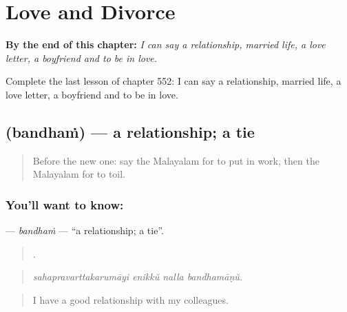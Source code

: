 
\chapter{Love and Divorce}
\label{ch:ml-love-and-divorce}

\begin{chapteropening}
\textbf{By the end of this chapter:} \emph{I can say a relationship, married life, a love letter, a boyfriend and to be in love.}

Complete the last lesson of chapter 552: I can say a relationship, married life, a love letter, a boyfriend and to be in love.
\end{chapteropening}

\section[\texorpdfstring{\ml{ബന്ധം} (bandhaṁ)}{ബന്ധം (bandhaṁ)}]{ (bandhaṁ) — a relationship; a tie}

\label{lesson:ML-C552-bandham}



\begin{quote}
Before the new one: say the Malayalam for to put in work, then the Malayalam for to toil.
\end{quote}

\subsection*{You'll want to know: }
\textbf{} — \emph{bandhaṁ} — \textquotedblleft{}a relationship; a tie\textquotedblright{}.

\begin{quote}
   .
\end{quote}

\begin{quote}
\emph{sahapravarttakarumāyi enikkŭ nalla bandhamāṇŭ.}
\end{quote}

\begin{quote}
I have a good relationship with my colleagues.
\end{quote}

